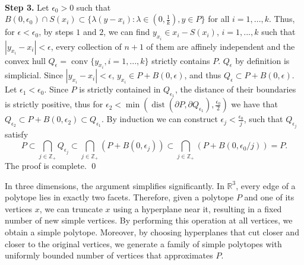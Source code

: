 \documentclass[footinclude=true]{amsart}
\theoremstyle{plain}
\DeclareMathOperator{\conv}{conv}
\DeclareMathOperator{\dist}{dist}
\begin{document}
\\ \textbf{Step 3.} Let $\epsilon_0>0$ such that $B(0,\epsilon_0)\cap S(x_i)\subset \{\lambda(y-x_i):\lambda\in (0,\frac{1}{k}),y\in P\}$ for all $i=1,...,k$. Thus, for $\epsilon<\epsilon_0$, by steps $1$ and $2$, we can find $y_{x_i}\in x_i-S(x_i)$, $i=1,...,k$ such that $|y_{x_i}-x_i|<\epsilon$, every collection of $n+1$ of them are affinely independent and the convex hull $Q_{\epsilon}=\conv\{y_{x_i},i=1,...,k\}$ strictly contains $P$. $Q_{\epsilon}$ by definition is simplicial. Since $|y_{x_i}-x_i|<\epsilon$, $y_{x_i}\in P+B(0,\epsilon)$, and thus $Q_{\epsilon}\subset P+B(0,\epsilon)$.
Let $\epsilon_1<\epsilon_0$. Since $P$ is strictly contained in $Q_{\epsilon_1}$, the distance of their boundaries is strictly positive, thus for $\epsilon_2<\min(\dist(\partial P,\partial Q_{\epsilon_1}),\frac{\epsilon_0}{2})$ we have that $Q_{\epsilon_2}\subset P+B(0,\epsilon_2)\subset Q_{\epsilon_1}$. By induction we can construct $\epsilon_j<\frac{\epsilon_0}{j}$, such that $Q_{\epsilon_j}$ satisfy $$P\subset\bigcap_{j\in\mathbb{Z}_{+}}Q_{\epsilon_j}\subset \bigcap_{j\in\mathbb{Z}_{+}} (P+B(0,\epsilon_j))\subset \bigcap_{j\in\mathbb{Z}_{+}} (P+B(0,\epsilon_0/j))=P.$$
The proof is complete.
 \qed	
    \\ \newline \par In three dimensions, the argument simplifies significantly. In $\mathbb{R}^3$, every edge of a polytope lies in exactly two facets. Therefore, given a polytope $P$ and one of its vertices $x$, we can truncate $x$ using a hyperplane near it, resulting in a fixed number of new simple vertices. By performing this operation at all vertices, we obtain a simple polytope. Moreover, by choosing hyperplanes that cut closer and closer to the original vertices, we generate a family of simple polytopes with uniformly bounded number of vertices that approximates $P$.
    
\end{document}

